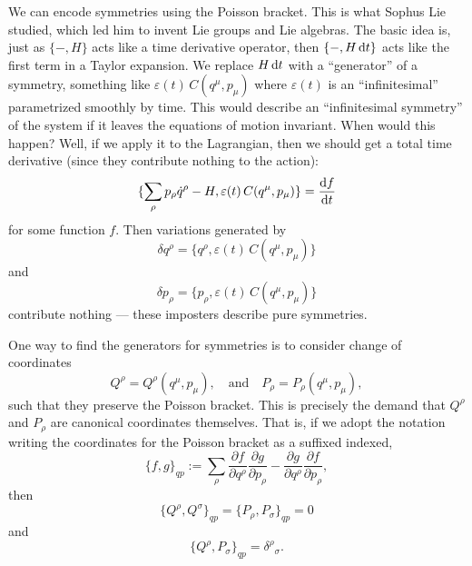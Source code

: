 We can encode symmetries using the Poisson bracket. This is what Sophus
Lie studied, which led him to invent Lie groups and Lie
algebras. The basic idea is, just as $\{-,H\}$ acts like a time
derivative operator, then $\{-,H\,\mathrm{d} t\}$ acts like the first term in a
Taylor expansion. We replace $H\,\mathrm{d} t$ with a ``generator'' of a
symmetry, something like $\varepsilon(t)\,C(q^{\mu},p_{\mu})$ where
$\varepsilon(t)$ is an ``infinitesimal'' parametrized smoothly by time. This
would describe an ``infinitesimal symmetry'' of the system if it leaves
the equations of motion invariant. When would this happen? Well, if we
apply it to the Lagrangian, then we should get a total time derivative
(since they contribute nothing to the action):
\begin{equation}
\{\sum_{\rho}p_{\rho}\dot{q}^{\rho} - H, \varepsilon(t)\,C(q^{\mu},p_{\mu})\}
 = \frac{\mathrm{d} f}{\mathrm{d} t}
\end{equation}
for some function $f$. Then variations generated by
\begin{equation}
\delta q^{\rho} = \{q^{\rho}, \varepsilon(t)\,C(q^{\mu},p_{\mu})\}
\end{equation}
and
\begin{equation}
\delta p_{\rho} = \{p_{\rho}, \varepsilon(t)\,C(q^{\mu},p_{\mu})\}
\end{equation}
contribute nothing --- these imposters describe pure symmetries.

One way to find the generators for symmetries is to consider change of
coordinates
\begin{equation}
Q^{\rho}=Q^{\rho}(q^{\mu},p_{\mu}),\quad\mbox{and}\quad
P_{\rho}=P_{\rho}(q^{\mu},p_{\mu}),
\end{equation}
such that they preserve the Poisson bracket. This is precisely the
demand that $Q^{\rho}$ and $P_{\rho}$ are canonical coordinates
themselves. That is, if we adopt the notation writing the coordinates
for the Poisson bracket as a suffixed indexed,
\begin{equation}
\{f, g\}_{qp} := \sum_{\rho}\frac{\partial f}{\partial q^{\rho}}\frac{\partial g}{\partial p_{\rho}}
- \frac{\partial g}{\partial q^{\rho}}\frac{\partial f}{\partial p_{\rho}},
\end{equation}
then
\begin{equation}
\{Q^{\rho}, Q^{\sigma}\}_{qp} = \{P_{\rho}, P_{\sigma}\}_{qp} = 0
\end{equation}
and
\begin{equation}
\{Q^{\rho}, P_{\sigma}\}_{qp} = {\delta^{\rho}}_{\sigma}.
\end{equation}

